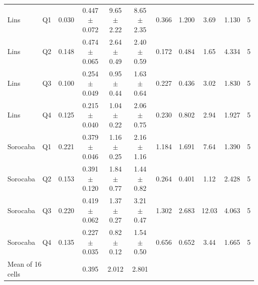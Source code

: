 \begin{table}[t]
{\begin{tabular}{ll c ccc c cc c c}
Lins & Q1 & 0.030 & 0.447 $\pm$ 0.072 & 9.65 $\pm$ 2.22 & 8.65 $\pm$ 2.35 & 0.366 & 1.200 & 3.69 & 1.130 & 5 \\
Lins & Q2 & 0.148 & 0.474 $\pm$ 0.065 & 2.64 $\pm$ 0.49 & 2.40 $\pm$ 0.59 & 0.172 & 0.484 & 1.65 & 4.334 & 5 \\
Lins & Q3 & 0.100 & 0.254 $\pm$ 0.049 & 0.95 $\pm$ 0.44 & 1.63 $\pm$ 0.64 & 0.227 & 0.436 & 3.02 & 1.830 & 5 \\
Lins & Q4 & 0.125 & 0.215 $\pm$ 0.040 & 1.04 $\pm$ 0.22 & 2.06 $\pm$ 0.75 & 0.230 & 0.802 & 2.94 & 1.927 & 5 \\
Sorocaba & Q1 & 0.221 & 0.379 $\pm$ 0.046 & 1.16 $\pm$ 0.25 & 2.16 $\pm$ 1.16 & 1.184 & 1.691 & 7.64 & 1.390 & 5 \\
Sorocaba & Q2 & 0.153 & 0.391 $\pm$ 0.120 & 1.84 $\pm$ 0.77 & 1.44 $\pm$ 0.82 & 0.264 & 0.401 & 1.12 & 2.428 & 5 \\
Sorocaba & Q3 & 0.220 & 0.419 $\pm$ 0.062 & 1.37 $\pm$ 0.27 & 3.21 $\pm$ 0.47 & 1.302 & 2.683 & 12.03 & 4.063 & 5 \\
Sorocaba & Q4 & 0.135 & 0.227 $\pm$ 0.035 & 0.82 $\pm$ 0.12 & 1.54 $\pm$ 0.50 & 0.656 & 0.652 & 3.44 & 1.665 & 5 \\
\midrule
\multicolumn{2}{l}{Mean of 16 cells} &  & 0.395 & 2.012 & 2.801 &  &  &  &  &  \\
\bottomrule
\end{tabular}%
}
\end{table}
